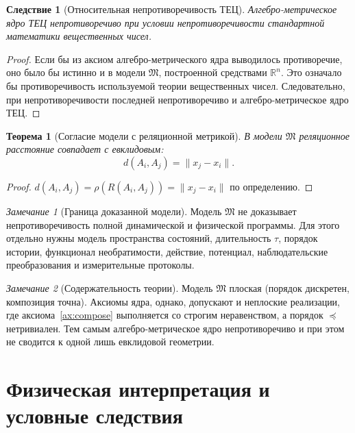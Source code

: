 \documentclass[12pt,a4paper,oneside]{book}
\theoremstyle{definition}
\theoremstyle{plain}
\newtheorem{theorem}{Теорема}[chapter]
\newtheorem{corollary}{Следствие}[chapter]
\theoremstyle{remark}
\newtheorem{remark}{Замечание}[chapter]
\newcommand{\Rel}{R}
\newcommand{\Vord}{\preceq}
\newcommand{\norm}{\rho}
\begin{document}
\begin{corollary}[Относительная непротиворечивость ТЕЦ]
Алгебро-метрическое ядро ТЕЦ непротиворечиво при условии непротиворечивости
стандартной математики вещественных чисел.
\end{corollary}

\begin{proof}
Если бы из аксиом алгебро-метрического ядра выводилось противоречие, оно было бы
истинно и в модели $\mathfrak M$, построенной средствами $\mathbb R^n$. Это означало
бы противоречивость используемой теории вещественных чисел. Следовательно, при
непротиворечивости последней непротиворечиво и алгебро-метрическое ядро ТЕЦ.
\end{proof}

\begin{theorem}[Согласие модели с реляционной метрикой]
В модели $\mathfrak M$ реляционное расстояние совпадает с евклидовым:
\[
d(A_i,A_j)=\|x_j-x_i\|.
\]
\end{theorem}

\begin{proof}
$d(A_i,A_j)=\norm(\Rel(A_i,A_j))=\|x_j-x_i\|$ по определению.
\end{proof}

\begin{remark}[Граница доказанной модели]
Модель $\mathfrak M$ не доказывает непротиворечивость полной динамической и
физической программы. Для этого отдельно нужны модель пространства состояний,
длительность $\tau$, порядок истории, функционал необратимости, действие, потенциал,
наблюдательские преобразования и измерительные протоколы.
\end{remark}

\begin{remark}[Содержательность теории]
Модель $\mathfrak M$ плоская (порядок дискретен, композиция точна). Аксиомы ядра,
однако, допускают и неплоские реализации, где аксиома~\ref{ax:compose} выполняется со
строгим неравенством, а порядок $\Vord$ нетривиален. Тем самым алгебро-метрическое
ядро непротиворечиво и при этом не сводится к одной лишь евклидовой геометрии.
\end{remark}

\chapter{Физическая интерпретация и условные следствия}
\end{document}
